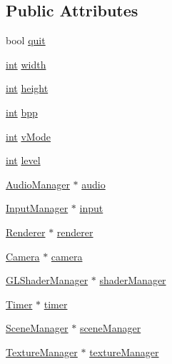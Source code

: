 \subsection*{Public Attributes}
\begin{DoxyCompactItemize}
\item 
bool \hyperlink{class_context_a18396436d360bb916d9ff6f9affa09fd}{quit}
\item 
\hyperlink{_s_d_l__thread_8h_a6a64f9be4433e4de6e2f2f548cf3c08e}{int} \hyperlink{class_context_a6d0fc950bf72cf1e1360d83c744199fb}{width}
\item 
\hyperlink{_s_d_l__thread_8h_a6a64f9be4433e4de6e2f2f548cf3c08e}{int} \hyperlink{class_context_a739c078fee0bb19a95f3dee7dc108739}{height}
\item 
\hyperlink{_s_d_l__thread_8h_a6a64f9be4433e4de6e2f2f548cf3c08e}{int} \hyperlink{class_context_aa91061e75e7d3e18df95ae92f13f1a22}{bpp}
\item 
\hyperlink{_s_d_l__thread_8h_a6a64f9be4433e4de6e2f2f548cf3c08e}{int} \hyperlink{class_context_a9a49b761af0f0dc8cab9121adfa6175f}{v\-Mode}
\item 
\hyperlink{_s_d_l__thread_8h_a6a64f9be4433e4de6e2f2f548cf3c08e}{int} \hyperlink{class_context_a048473846a616dccfb505c3d16b53e1a}{level}
\item 
\hyperlink{class_audio_manager}{Audio\-Manager} $\ast$ \hyperlink{class_context_a3302ca284ccc8094ce2a497dcb06a4a0}{audio}
\item 
\hyperlink{class_input_manager}{Input\-Manager} $\ast$ \hyperlink{class_context_ae8838a6789805b90ba8c159d6efe471d}{input}
\item 
\hyperlink{class_renderer}{Renderer} $\ast$ \hyperlink{class_context_af9a7bf785053580e1f0593b8ffbec6b2}{renderer}
\item 
\hyperlink{class_camera}{Camera} $\ast$ \hyperlink{class_context_a178048052fa4964079e3330ac5598559}{camera}
\item 
\hyperlink{class_g_l_shader_manager}{G\-L\-Shader\-Manager} $\ast$ \hyperlink{class_context_afb9c9684564aed2d556e2a11ade22d22}{shader\-Manager}
\item 
\hyperlink{class_timer}{Timer} $\ast$ \hyperlink{class_context_a50debe673def575a9eeb00d8102ebbe8}{timer}
\item 
\hyperlink{class_scene_manager}{Scene\-Manager} $\ast$ \hyperlink{class_context_a2d2b097b9e9a50f791ceec2fe2eaf6db}{scene\-Manager}
\item 
\hyperlink{class_texture_manager}{Texture\-Manager} $\ast$ \hyperlink{class_context_ac50427687358ac8d9eb170dfcadab069}{texture\-Manager}
\end{DoxyCompactItemize}
